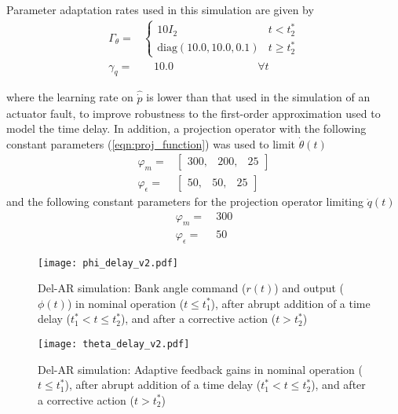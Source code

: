 \noindent Parameter adaptation rates used in this simulation are given by
\begin{align}
	\Gamma_\theta  = & \begin{cases}
		10 I_2 & t < t_2^*\\
		\text{diag}(10.0, 10.0, 0.1) & t \geq t_2^*
 	\end{cases} \\
	\gamma_q  = &\quad 10.0 \qquad ~ \qquad ~ \qquad ~ \quad \forall t
\end{align}

\noindent where the learning rate on $\hat{\dot{p}}$ is lower than that used in the simulation of an actuator fault, to improve robustness to the first-order approximation used to model the time delay. In addition, a projection operator with the following constant parameters (\ref{eqn:proj_function}) was used to limit $\dot{\theta}(t)$
\begin{align}
	\varphi_m = & \begin{bmatrix}
		300, & 200, & 25
	\end{bmatrix} \\
	\varphi_{\epsilon} = & \begin{bmatrix}
		50, & 50, & 25
	\end{bmatrix}\end{align}
\noindent and the following constant parameters for the projection operator limiting $\dot{q}(t)$
\begin{align}
	\varphi_m = &~ 300\\
	\varphi_{\epsilon} = &~ 50
\end{align}

\begin{figure}[h!]
	\centering
	\texttt{[image: phi\_delay\_v2.pdf]}
	\caption{Del-AR simulation: Bank angle command ($r(t)$) and output ($\phi(t)$) in nominal operation ($t \leq t_1^*$), after abrupt addition of a time delay ($t_1^* < t \leq t_2^*$), and after a corrective action ($t > t_2^*$)}
	\label{fig:command_and_output_d}
\end{figure}

\begin{figure}[h!]
	\centering
	\texttt{[image: theta\_delay\_v2.pdf]}
	\caption{Del-AR simulation: Adaptive feedback gains in nominal operation ($t \leq t_1^*$), after abrupt addition of a time delay ($t_1^* < t \leq t_2^*$), and after a corrective action ($t > t_2^*$)}
	\label{fig:theta_d}
\end{figure}


